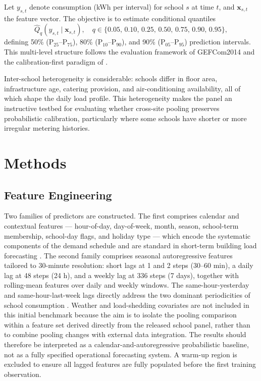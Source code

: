 \documentclass[12pt,a4paper]{article}
\begin{document}
Let $y_{s,t}$ denote consumption (kWh per interval) for school $s$ at time $t$, and $\mathbf{x}_{s,t}$ the feature vector. The objective is to estimate conditional quantiles
\begin{equation}
  \hat{Q}_q\!\left(y_{s,t} \mid \mathbf{x}_{s,t}\right), \quad q \in \{0.05,\,0.10,\,0.25,\,0.50,\,0.75,\,0.90,\,0.95\},
\end{equation}
defining 50\% ($\mathrm{P}_{25}$--$\mathrm{P}_{75}$), 80\% ($\mathrm{P}_{10}$--$\mathrm{P}_{90}$), and 90\% ($\mathrm{P}_{05}$--$\mathrm{P}_{95}$) prediction intervals. This multi-level structure follows the evaluation framework of GEFCom2014 \citep{hong2016gefcom} and the calibration-first paradigm of \citet{gneitingbal2007}.

Inter-school heterogeneity is considerable: schools differ in floor area, infrastructure age, catering provision, and air-conditioning availability, all of which shape the daily load profile. This heterogeneity makes the panel an instructive testbed for evaluating whether cross-site pooling preserves probabilistic calibration, particularly where some schools have shorter or more irregular metering histories.


\section{Methods}

\subsection{Feature Engineering}

Two families of predictors are constructed. The first comprises calendar and contextual features --- hour-of-day, day-of-week, month, season, school-term membership, school-day flags, and holiday type --- which encode the systematic components of the demand schedule and are standard in short-term building load forecasting \citep{haben2019, hongfan2016}. The second family comprises seasonal autoregressive features tailored to 30-minute resolution: short lags at 1 and 2 steps (30--60 min), a daily lag at 48 steps (24 h), and a weekly lag at 336 steps (7 days), together with rolling-mean features over daily and weekly windows. The same-hour-yesterday and same-hour-last-week lags directly address the two dominant periodicities of school consumption \citep{haben2019, bentaieb2021}. Weather and load-shedding covariates are not included in this initial benchmark because the aim is to isolate the pooling comparison within a feature set derived directly from the released school panel, rather than to combine pooling changes with external data integration. The results should therefore be interpreted as a calendar-and-autoregressive probabilistic baseline, not as a fully specified operational forecasting system. A warm-up region is excluded to ensure all lagged features are fully populated before the first training observation.
\end{document}

